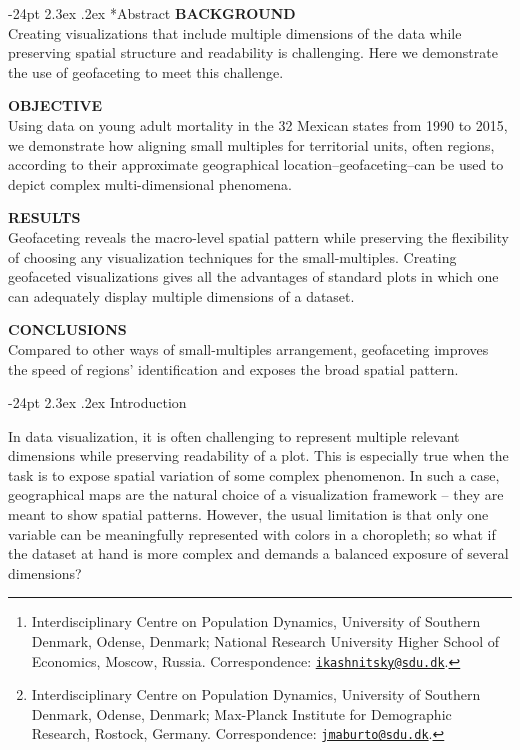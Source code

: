 \documentclass[10pt, twoside, parskip=half]{article}
\title{\large\textbf{Geofaceting -- align small-multiples for regions in a spatially meaningful way}\vskip 0em}
\author{\normalsize\textrm{\textbf{Ilya Kashnitsky\footnote{Interdisciplinary Centre on Population Dynamics, University of Southern Denmark, Odense, Denmark; National Research University Higher School of Economics, Moscow, Russia. Correspondence: \href{mailto:ikashnitsky@sdu.dk}{\nolinkurl{ikashnitsky@sdu.dk}}.}}}\\\normalsize\textrm{\textbf{José Manuel Aburto\footnote{Interdisciplinary Centre on Population Dynamics, University of Southern Denmark, Odense, Denmark; Max-Planck Institute for Demographic Research, Rostock, Germany. Correspondence: \href{mailto:jmaburto@sdu.dk}{\nolinkurl{jmaburto@sdu.dk}}.}}}}
\date{\vspace{-5ex}}
\makeatletter
\renewcommand\section{\@startsection {section}{1}{\z@}%
                                   {-24pt}%
                                   {2.3ex \@plus.2ex}%
                                   {\normalfont\large\bfseries}}
\makeatother
\begin{document}
  \maketitle

\vspace*{-24pt}
\vspace*{5mm}
\setlength{\parskip}{0.5em}
\section*{Abstract}
  \noindent\textbf{BACKGROUND}\\
  Creating visualizations that include multiple dimensions of the data while preserving spatial structure and readability is challenging. Here we demonstrate the use of geofaceting to meet this challenge.
  \par
  \noindent\textbf{OBJECTIVE}\\
  Using data on young adult mortality in the 32 Mexican states from 1990 to 2015, we demonstrate how aligning small multiples for territorial units, often regions, according to their approximate geographical location--geofaceting--can be used to depict complex multi-dimensional phenomena.
  \par
  \noindent\textbf{RESULTS}\\
  Geofaceting reveals the macro-level spatial pattern while preserving the flexibility of choosing any visualization techniques for the small-multiples. Creating geofaceted visualizations gives all the advantages of standard plots in which one can adequately display multiple dimensions of a dataset.
  \par
  \noindent\textbf{CONCLUSIONS}\\
  Compared to other ways of small-multiples arrangement, geofaceting improves the speed of regions' identification and exposes the broad spatial pattern.
  \par
\vspace*{12pt}

\setlength{\parskip}{0ex}

\newpage

\hypertarget{introduction}{%
\section{Introduction}\label{introduction}}

In data visualization, it is often challenging to represent multiple relevant dimensions while preserving readability of a plot. This is especially true when the task is to expose spatial variation of some complex phenomenon. In such a case, geographical maps are the natural choice of a visualization framework -- they are meant to show spatial patterns. However, the usual limitation is that only one variable can be meaningfully represented with colors in a choropleth; so what if the dataset at hand is more complex and demands a balanced exposure of several dimensions?
\end{document}
